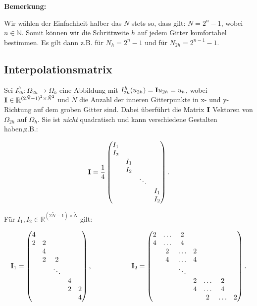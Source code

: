 \textbf{Bemerkung:}

Wir wählen der Einfachheit halber das $N$ stets so, dass gilt: $N = 2^{n} - 1$, wobei $n \in \mathbb{N}$. Somit können wir die Schrittweite $h$ auf jedem Gitter komfortabel bestimmen. Es gilt dann z.B. für $N_{h} = 2^{n} - 1$ und für $N_{2h} = 2^{n-1} - 1$.

\subsection{Interpolationsmatrix}

Sei $I^{h}_{2h}: \Omega_{2h} \longrightarrow \Omega_{h}$ eine Abbildung mit $I_{2h}^{h}(u_{2h}) = {\textbf{I}}u_{2h} = u_{h}$, wobei ${\textbf{I}} \in \mathbb{R}^{(2 \tilde N - 1)^{2} \times \tilde N^{2}}$ und $\tilde N$ die Anzahl der inneren Gitterpunkte in x- und y-Richtung auf dem groben Gitter sind. Dabei überführt die Matrix ${\textbf{I}}$ Vektoren von $\Omega_{2h}$ auf $\Omega_{h}$. Sie ist \textit{nicht} quadratisch und kann verschiedene Gestalten haben,z.B.:

\begin{equation}
{\textbf{I}} = \frac {1} {4}
\begin{pmatrix}
I_{1} & & &\\
I_{2} & & &\\
& I_{1} & &\\
& I_{2} & &\\
& & \ddots &\\
& & & I_{1}\\
& & & I_{2}
\end{pmatrix}.
\end{equation}

Für $I_{1},I_{2} \in \mathbb{R}^{(2\tilde N - 1) \times \tilde N}$ gilt:

\begin{equation}
{\textbf{I}}_{1} =
\begin{pmatrix}
4 & & & &\\
2 & 2 & & &\\
& 4 & & &\\
& 2 & 2 & &\\
& & \ddots & &\\
& & & 4 &\\
& & & 2 & 2\\
& & & & 4\\
\end{pmatrix},
\hspace{2cm}
{\textbf{I}}_{2} =
\begin{pmatrix}
2 & \hdots & 2 & & & &\\
4 & \hdots & 4 & & & &\\
& 2 & \hdots & 2 & & &\\
& 4 & \hdots & 4 & & &\\
& & \ddots & & & &\\
& & & 2 & \hdots & 2 &\\
& & & 4 & \hdots & 4 &\\
& & & & 2 & \hdots & 2\\
\end{pmatrix}.
\end{equation}

